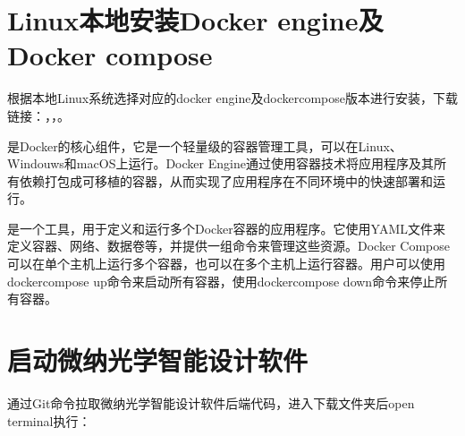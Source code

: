 \documentclass[a4paper,10pt,english]{sphinxmanual}
\begin{document}
\section{Linux本地安装Docker engine及Docker compose}
\label{\detokenize{_u8f6f_u4ef6_u5b89_u88c5/index:linuxdocker-enginedocker-compose}}
\sphinxAtStartPar
根据本地Linux系统选择对应的docker engine及docker\sphinxhyphen{}compose版本进行安装，下载链接：，，。

\sphinxAtStartPar
{}是Docker的核心组件，它是一个轻量级的容器管理工具，可以在Linux、Windouws和macOS上运行。Docker Engine通过使用容器技术将应用程序及其所有依赖打包成可移植的容器，从而实现了应用程序在不同环境中的快速部署和运行。

\sphinxAtStartPar
{}是一个工具，用于定义和运行多个Docker容器的应用程序。它使用YAML文件来定义容器、网络、数据卷等，并提供一组命令来管理这些资源。Docker Compose可以在单个主机上运行多个容器，也可以在多个主机上运行容器。用户可以使用docker\sphinxhyphen{}compose up命令来启动所有容器，使用docker\sphinxhyphen{}compose down命令来停止所有容器。


\section{启动微纳光学智能设计软件}
\label{\detokenize{_u8f6f_u4ef6_u5b89_u88c5/index:id2}}
\sphinxAtStartPar
通过Git命令拉取微纳光学智能设计软件后端代码，进入下载文件夹后open terminal执行：
\end{document}
